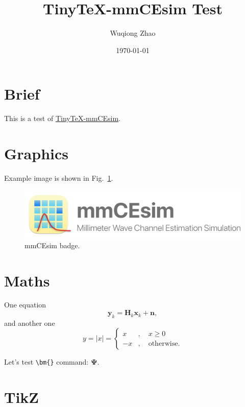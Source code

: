 \documentclass{article}
\title{TinyTeX-mmCEsim Test}
\author{Wuqiong Zhao}
\date{\today}
\begin{document}
  \maketitle

  \section{Brief}
    This is a test of \href{https://github.com/mmcesim/tinytex-mmcesim}{TinyTeX-mmCEsim}.

  \section{Graphics}
    
    Example image is shown in Fig.~\ref{fig:example}.
    \begin{figure}[htbp]
      \centering
      \includegraphics[width=\linewidth]{mmCEsim_badge.png}
      \caption{mmCEsim badge.}
      \label{fig:example}
    \end{figure}

  \section{Maths}

    One equation
    \begin{equation}
      \mathbf{y}_k=\mathbf{H}_k\mathbf{x}_k+\mathbf{n},
    \end{equation}
    and another one
    \begin{equation}
      y=|x|=
      \left\{
        \begin{aligned}
          x&,\quad x\geq0\\
          -x&,\quad\mathrm{otherwise}.
        \end{aligned}
      \right.
    \end{equation}
    
    Let's test \verb+\bm{}+ command: $\bm{\Psi}$.

  \newpage
  \section{TikZ}

    \begin{figure}[htbp]
      \centering
    \end{figure}
  
\end{document}
